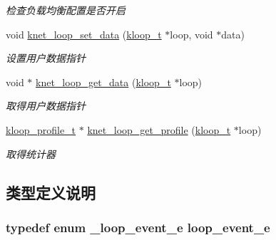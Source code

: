 \begin{DoxyCompactItemize}
\begin{DoxyCompactList}\small\item\em 检查负载均衡配置是否开启 \end{DoxyCompactList}\item 
void \hyperlink{a00108_gaf1239ea65307d7dc588175c45947437b_gaf1239ea65307d7dc588175c45947437b}{knet\+\_\+loop\+\_\+set\+\_\+data} (\hyperlink{a00053_a97fc76209a58362019f1ded9169e397f_a97fc76209a58362019f1ded9169e397f}{kloop\+\_\+t} $\ast$loop, void $\ast$data)
\begin{DoxyCompactList}\small\item\em 设置用户数据指针 \end{DoxyCompactList}\item 
void $\ast$ \hyperlink{a00071_a408e38fd57e572c9f9fd70d729663495_a408e38fd57e572c9f9fd70d729663495}{knet\+\_\+loop\+\_\+get\+\_\+data} (\hyperlink{a00053_a97fc76209a58362019f1ded9169e397f_a97fc76209a58362019f1ded9169e397f}{kloop\+\_\+t} $\ast$loop)
\begin{DoxyCompactList}\small\item\em 取得用户数据指针 \end{DoxyCompactList}\item 
\hyperlink{a00053_ab75a5c23099a6118c469ed160b277f28_ab75a5c23099a6118c469ed160b277f28}{kloop\+\_\+profile\+\_\+t} $\ast$ \hyperlink{a00108_gafc6a946f7c7fd4fb0508ac0f88969da1_gafc6a946f7c7fd4fb0508ac0f88969da1}{knet\+\_\+loop\+\_\+get\+\_\+profile} (\hyperlink{a00053_a97fc76209a58362019f1ded9169e397f_a97fc76209a58362019f1ded9169e397f}{kloop\+\_\+t} $\ast$loop)
\begin{DoxyCompactList}\small\item\em 取得统计器 \end{DoxyCompactList}\end{DoxyCompactItemize}


\subsection{类型定义说明}
\hypertarget{a00071_ab92fe4e788615cfd56530167651a8ff4_ab92fe4e788615cfd56530167651a8ff4}{}
\subsubsection[{loop\+\_\+event\+\_\+e}]{\setlength{\rightskip}{0pt plus 5cm}typedef enum {\bf \+\_\+loop\+\_\+event\+\_\+e}  {\bf loop\+\_\+event\+\_\+e}}\label{a00071_ab92fe4e788615cfd56530167651a8ff4_ab92fe4e788615cfd56530167651a8ff4}
\hypertarget{a00071_a1095ee772017ce29dcac0987c456709e_a1095ee772017ce29dcac0987c456709e}{}
